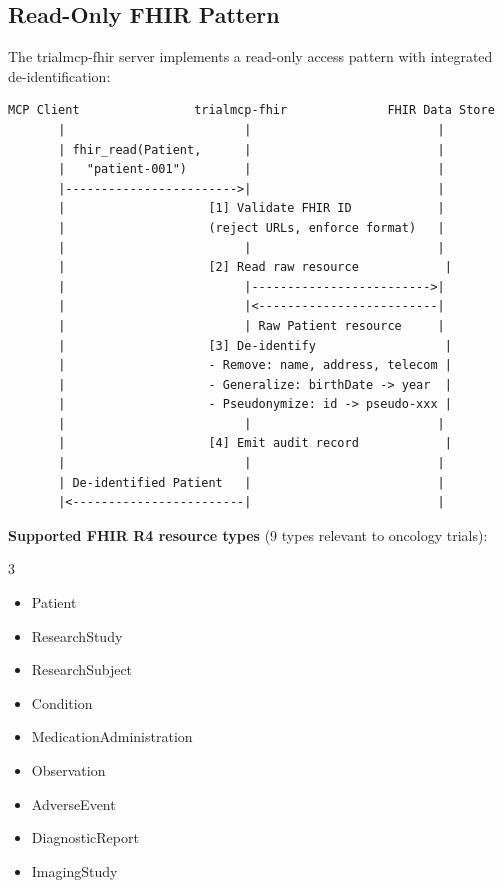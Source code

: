 \documentclass[10pt,letterpaper]{article}
\begin{document}
\subsection{Read-Only FHIR Pattern}

The trialmcp-fhir server implements a read-only access pattern with integrated de-identification:

\begin{lstlisting}[title={\textbf{FHIR Read-Only Access Pattern with De-identification}}]
  MCP Client                trialmcp-fhir              FHIR Data Store
       |                         |                          |
       | fhir_read(Patient,      |                          |
       |   "patient-001")        |                          |
       |------------------------>|                          |
       |                    [1] Validate FHIR ID            |
       |                    (reject URLs, enforce format)   |
       |                         |                          |
       |                    [2] Read raw resource            |
       |                         |------------------------->|
       |                         |<-------------------------|
       |                         | Raw Patient resource     |
       |                    [3] De-identify                  |
       |                    - Remove: name, address, telecom |
       |                    - Generalize: birthDate -> year  |
       |                    - Pseudonymize: id -> pseudo-xxx |
       |                         |                          |
       |                    [4] Emit audit record            |
       |                         |                          |
       | De-identified Patient   |                          |
       |<------------------------|                          |
\end{lstlisting}

\textbf{Supported FHIR R4 resource types} (9 types relevant to oncology trials):

\begin{multicols}{3}
\begin{itemize}[leftmargin=1.5em,itemsep=0pt]
    \item Patient
    \item ResearchStudy
    \item ResearchSubject
    \item Condition
    \item MedicationAdministration
    \item Observation
    \item AdverseEvent
    \item DiagnosticReport
    \item ImagingStudy
\end{itemize}
\end{multicols}
\end{document}
